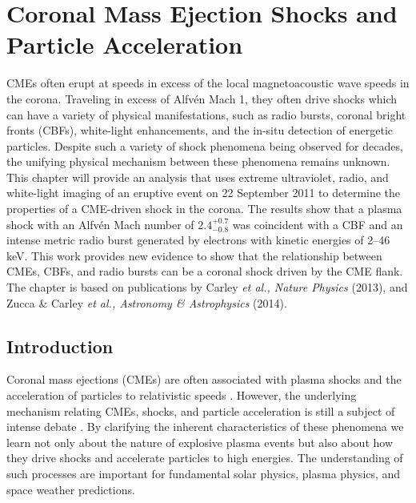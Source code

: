 \vspace{-5mm}
\singlespacing
\chapter{Coronal Mass Ejection Shocks and Particle Acceleration} 
\label{chap:5}
\doublespacing
\vspace{-10mm}
CMEs often erupt at speeds in excess of the local magnetoacoustic wave speeds in the corona. Traveling in excess of Alfv\'{e}n Mach 1, they often drive shocks which can have a variety of physical manifestations, such as radio bursts, coronal bright fronts (CBFs), white-light enhancements, and the in-situ detection of energetic particles. Despite such a variety of shock phenomena being observed for decades, the unifying physical mechanism between these phenomena remains unknown. This chapter will provide an analysis that uses extreme ultraviolet, radio, and white-light imaging of an eruptive event on 22 September 2011 to determine the properties of a CME-driven shock in the corona. The results show that a plasma shock with an Alfv\'{e}n Mach number of $2.4^{+0.7}_{-0.8}$ was coincident with a CBF and an intense metric radio burst generated by electrons with kinetic energies of 2--46 keV. This work provides new evidence to show that the relationship between CMEs, CBFs, and radio bursts can be a coronal shock driven by the CME flank. The chapter is based on publications by Carley {\it et al., Nature Physics} (2013), and Zucca \& Carley {\it et al.,  Astronomy \& Astrophysics} (2014).

\doublespacing
\section{Introduction}\label{sec:1}
Coronal mass ejections (CMEs) 
are often associated with plasma shocks and the acceleration of particles to relativistic speeds \citep{klassen2002, grechnev2011}. However, the underlying mechanism relating CMEs, shocks, and particle acceleration is still a subject of intense debate \citep{vrsnak2008}. By clarifying the inherent characteristics of these phenomena we learn not only about the nature of explosive plasma events but also about how they drive shocks and accelerate particles to high energies. The understanding of such processes are important for fundamental solar physics, plasma physics, and space weather predictions.

